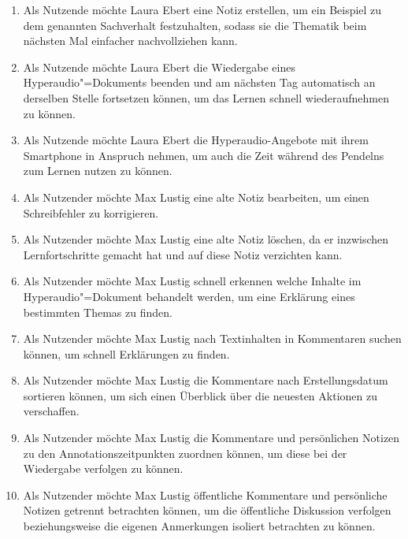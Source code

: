 \begin{enumerate}[leftmargin=1.3cm,label=US-\arabic*:,ref=US-\arabic*]
\item \label{US-Notiz-S} Als Nutzende möchte Laura Ebert eine Notiz erstellen, um ein Beispiel zu dem genannten Sachverhalt festzuhalten, sodass sie die Thematik beim nächsten Mal einfacher nachvollziehen kann.

\item \label{US-Fortsetzen} Als Nutzende möchte Laura Ebert die Wiedergabe eines Hyperaudio"=Dokuments beenden und am nächsten Tag automatisch an derselben Stelle fortsetzen können, um das Lernen schnell wiederaufnehmen zu können.

\item \label{US-Mobil} Als Nutzende möchte Laura Ebert die Hyperaudio-Angebote mit ihrem Smartphone in Anspruch nehmen, um auch die Zeit während des Pendelns zum Lernen nutzen zu können.

\item \label{US-Notiz-Bearbeiten} Als Nutzender möchte Max Lustig eine alte Notiz bearbeiten, um einen Schreibfehler zu korrigieren.

\item \label{US-Notiz-Loeschen} Als Nutzender möchte Max Lustig eine alte Notiz löschen, da er inzwischen Lernfortschritte gemacht hat und auf diese Notiz verzichten kann.

\item \label{US-Galerie} Als Nutzender möchte Max Lustig schnell erkennen welche Inhalte im Hyperaudio"=Dokument behandelt werden, um eine Erklärung eines bestimmten Themas zu finden.

\item \label{US-Suche} Als Nutzender möchte Max Lustig nach Textinhalten in Kommentaren suchen können, um schnell Erklärungen zu finden.

\item \label{US-Sortierung-Erstellungsdatum} Als Nutzender möchte Max Lustig die Kommentare nach Erstellungsdatum sortieren können, um sich einen Überblick über die neuesten Aktionen zu verschaffen.

\item \label{US-Sortierung-Zeitpunkt} Als Nutzender möchte Max Lustig die Kommentare und persönlichen Notizen zu den Annotationszeitpunkten zuordnen können, um diese bei der Wiedergabe verfolgen zu können.

\item \label{US-Filter} Als Nutzender möchte Max Lustig öffentliche Kommentare und persönliche Notizen getrennt betrachten können, um die öffentliche Diskussion verfolgen beziehungsweise die eigenen Anmerkungen isoliert betrachten zu können.


\end{enumerate}
